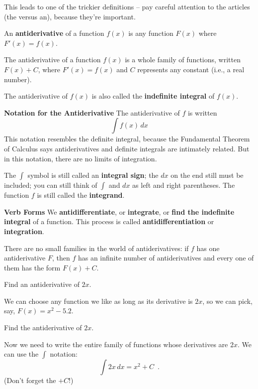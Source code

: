 This leads to one of the trickier definitions – pay careful attention to the articles (the versus an), because they're important.

\begin{definition}[Antiderivatives]
An {\bf antiderivative} of a function $f(x)$ is any function $F(x)$ where $F'(x)=f(x)$.

The antiderivative of a function $f(x)$ is a whole family of functions, written $F(x)+C$, where $F'(x)=f(x)$ and $C$ represents any constant (i.e., a real number).

The antiderivative of $f(x)$ is also called the {\bf indefinite integral} of $f(x)$.

{\bf Notation for the Antiderivative}
The antiderivative of $f$ is written
$$\int f(x)\,dx$$
This notation resembles the definite integral, because the Fundamental Theorem of Calculus says antiderivatives and definite integrals are intimately related. But in this notation, there are no limits of integration.

The $\int$ symbol is still called an {\bf integral sign}; the $dx$  on the end still must be included; you can still think of $\int$ and $dx$  as left and right parentheses. The function $f$ is still called the {\bf integrand}.

{\bf Verb Forms}
We {\bf antidifferentiate}, or {\bf integrate}, or {\bf find the indefinite integral} of a function. This process is called {\bf antidifferentiation} or {\bf integration}.
\end{definition}

There are no small families in the world of antiderivatives: if $f$ has one antiderivative $F$, then $f$ has an infinite number of antiderivatives and every one of them has the form $F(x)+C$.

\begin{example}
Find an antiderivative of $2x$.

\begin{solution}
We can choose any function we like as long as its derivative is $2x$, so we can pick, say, $F(x)=x^2-5.2$.
\end{solution}\end{example}

\begin{example}
Find the antiderivative of $2x$.

\begin{solution}
  Now we need to write the entire family of functions whose derivatives are $2x$. We can use the $\int$ notation:
$$\int 2x\,dx = x^2+C \enspace .$$
(Don't forget the $+C$!)
\end{solution}\end{example}

